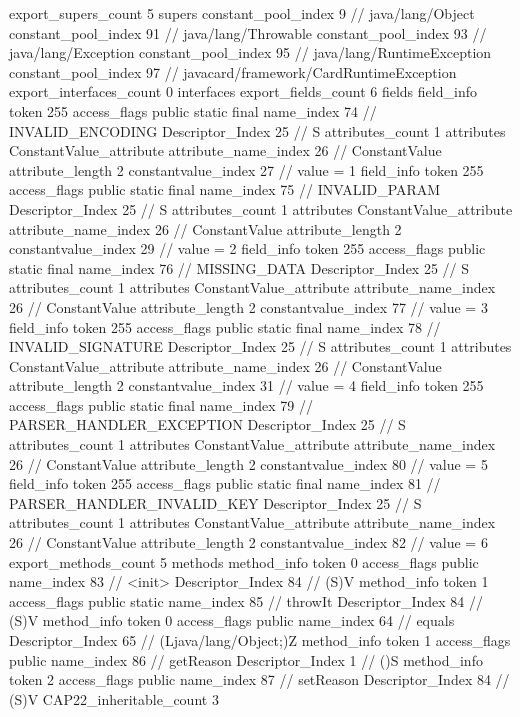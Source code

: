 {{{			export_supers_count	5
			supers {
				constant_pool_index	9		// java/lang/Object
				constant_pool_index	91		// java/lang/Throwable
				constant_pool_index	93		// java/lang/Exception
				constant_pool_index	95		// java/lang/RuntimeException
				constant_pool_index	97		// javacard/framework/CardRuntimeException
			}
			export_interfaces_count	0
			interfaces {
			}
			export_fields_count	6
			fields {
			field_info {
				token	255
				access_flags	public static final
				name_index	74		// INVALID_ENCODING
				Descriptor_Index	25		// S
				attributes_count	1
				attributes {
				ConstantValue_attribute {
					attribute_name_index	26		// ConstantValue
					attribute_length	2
					constantvalue_index	27		// value = 1
				}
				}
			}
			field_info {
				token	255
				access_flags	public static final
				name_index	75		// INVALID_PARAM
				Descriptor_Index	25		// S
				attributes_count	1
				attributes {
				ConstantValue_attribute {
					attribute_name_index	26		// ConstantValue
					attribute_length	2
					constantvalue_index	29		// value = 2
				}
				}
			}
			field_info {
				token	255
				access_flags	public static final
				name_index	76		// MISSING_DATA
				Descriptor_Index	25		// S
				attributes_count	1
				attributes {
				ConstantValue_attribute {
					attribute_name_index	26		// ConstantValue
					attribute_length	2
					constantvalue_index	77		// value = 3
				}
				}
			}
			field_info {
				token	255
				access_flags	public static final
				name_index	78		// INVALID_SIGNATURE
				Descriptor_Index	25		// S
				attributes_count	1
				attributes {
				ConstantValue_attribute {
					attribute_name_index	26		// ConstantValue
					attribute_length	2
					constantvalue_index	31		// value = 4
				}
				}
			}
			field_info {
				token	255
				access_flags	public static final
				name_index	79		// PARSER_HANDLER_EXCEPTION
				Descriptor_Index	25		// S
				attributes_count	1
				attributes {
				ConstantValue_attribute {
					attribute_name_index	26		// ConstantValue
					attribute_length	2
					constantvalue_index	80		// value = 5
				}
				}
			}
			field_info {
				token	255
				access_flags	public static final
				name_index	81		// PARSER_HANDLER_INVALID_KEY
				Descriptor_Index	25		// S
				attributes_count	1
				attributes {
				ConstantValue_attribute {
					attribute_name_index	26		// ConstantValue
					attribute_length	2
					constantvalue_index	82		// value = 6
				}
				}
			}
			}
			export_methods_count	5
			methods {
				method_info {
					token	0
					access_flags	public
					name_index	83		// <init>
					Descriptor_Index	84		// (S)V
				}
				method_info {
					token	1
					access_flags	public static
					name_index	85		// throwIt
					Descriptor_Index	84		// (S)V
				}
				method_info {
					token	0
					access_flags	public
					name_index	64		// equals
					Descriptor_Index	65		// (Ljava/lang/Object;)Z
				}
				method_info {
					token	1
					access_flags	public
					name_index	86		// getReason
					Descriptor_Index	1		// ()S
				}
				method_info {
					token	2
					access_flags	public
					name_index	87		// setReason
					Descriptor_Index	84		// (S)V
				}
			}
			CAP22_inheritable_count	3
		}
	}
}
